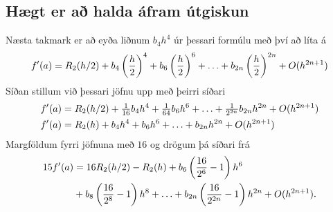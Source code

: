 \documentclass[A4paper,10pt,icelandic]{sphinxmanual}
\begin{document}
\subsection{Hægt er að halda áfram útgiskun}
\label{kafli04:haegt-er-a-halda-afram-utgiskun}
Næsta takmark er að eyða liðnum \(b_4h^4\) úr þessari formúlu með
því að líta á
\begin{gather}
\begin{split}f'(a) = R_2(h/2) + b_4 \left(\frac{h}{2}\right)^4
  + b_6 \left(\frac{h}{2}\right)^6 + \ldots
  + b_{2n} \left(\frac{h}{2}\right)^{2n} + O(h^{2n+1})\end{split}\notag
\end{gather}
Síðan stillum við þessari jöfnu upp með þeirri síðari
\begin{gather}
\begin{split}\begin{aligned}
  f'(a) &= R_2(h/2) + \tfrac 1{16}b_4 h^4
  + \tfrac 1{64}b_6 h^6 + \ldots
  + \tfrac 1{2^{2n}}b_{2n} h^{2n} + O(h^{2n+1})\\
  f'(a) &= R_2(h) + b_4 h^4 + b_6 h^6 + \ldots + b_{2n} h^{2n}
  + O(h^{2n+1})\end{aligned}\end{split}\notag
\end{gather}
Margföldum fyrri jöfnuna með \(16\) og drögum þá síðari frá
\begin{gather}
\begin{split}\begin{aligned}
  15f'(a) &= 16 R_2(h/2) - R_2(h)
  + b_6 \left( \frac{16}{2^6} - 1 \right) h^6 \\
  &+ b_8 \left( \frac{16}{2^8} - 1 \right) h^8
  + \ldots
  + b_{2n} \left( \frac{16}{2^{2n}} - 1 \right) h^{2n}
  + O(h^{2n+1}).\end{aligned}\end{split}\notag
\end{gather}
\end{document}
